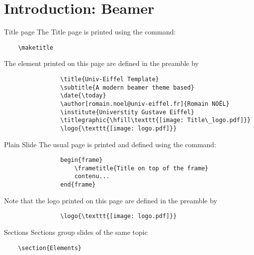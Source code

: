 	\section{Introduction: Beamer}

		\begin{frame}[fragile]{Title page}
			The Title page is printed using the command:			
			\begin{verbatim}    \maketitle\end{verbatim}
			
			The element printed on this page are defined in the preamble by
			\begin{verbatim}
				\title{Univ-Eiffel Template}
				\subtitle{A modern beamer theme based}
				\date{\today}
				\author[romain.noel@univ-eiffel.fr]{Romain NOËL}
				\institute{Universtity Gustave Eiffel}
				\titlegraphic{\hfill\texttt{[image: Title\_logo.pdf]}}
				\logo{\texttt{[image: logo.pdf]}}
			\end{verbatim}
		\end{frame}
		
		\begin{frame}[fragile]{Plain Slide}
			The usual page is printed and defined using the command:			
			\begin{verbatim}
			    begin{frame}
					\frametitle{Title on top of the frame}
					contenu...
				end{frame}
			\end{verbatim}
			
			Note that the logo printed on this page are defined in the preamble by
			\begin{verbatim}
				\logo{\texttt{[image: logo.pdf]}}
			\end{verbatim}
		\end{frame}
	
		\begin{frame}[fragile]{Sections}
			Sections group slides of the same topic
			
			\begin{verbatim}    \section{Elements}\end{verbatim}
		\end{frame}
	
